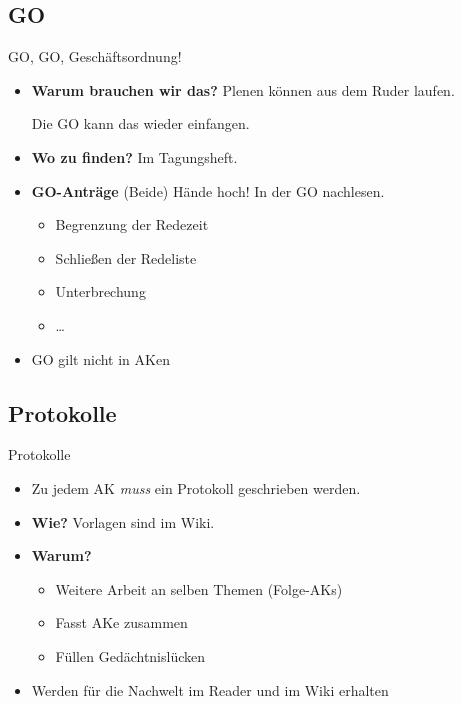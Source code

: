 \documentclass[compress,]{beamer}
\begin{document}
\subsection{GO}

\begin{frame}{GO, GO, Geschäftsordnung!}

  \begin{itemize}
  \item<1-> \textbf{Warum brauchen wir das?} Plenen können aus dem Ruder
    laufen.

    Die GO kann das wieder einfangen.
  \item<2-> \textbf{Wo zu finden?} Im Tagungsheft.
  \item<3-> \textbf{GO-Anträge} (Beide) Hände hoch! In der GO nachlesen.

    \begin{itemize}
    \item<5-> Begrenzung der Redezeit
    \item<6-> Schließen der Redeliste
    \item<7-> Unterbrechung
    \item<8-> \ldots
    \end{itemize}
  \item<9-> GO gilt nicht in AKen
  \end{itemize}

\end{frame}


\subsection{Protokolle}

\begin{frame}{Protokolle}

  \begin{itemize}
  \item<1-> Zu jedem AK \emph{muss} ein Protokoll geschrieben werden.
  \item<2-> \textbf{Wie?} Vorlagen sind im Wiki.

  \item<4-> \textbf{Warum?}
    \begin{itemize}
    \item<5-> Weitere Arbeit an selben Themen (Folge-AKs)
    \item<6-> Fasst AKe zusammen
    \item<7-> Füllen Gedächtnislücken
    \end{itemize}
  \item<8-> Werden für die Nachwelt im Reader und im Wiki erhalten
  \end{itemize}

\end{frame}
\end{document}
